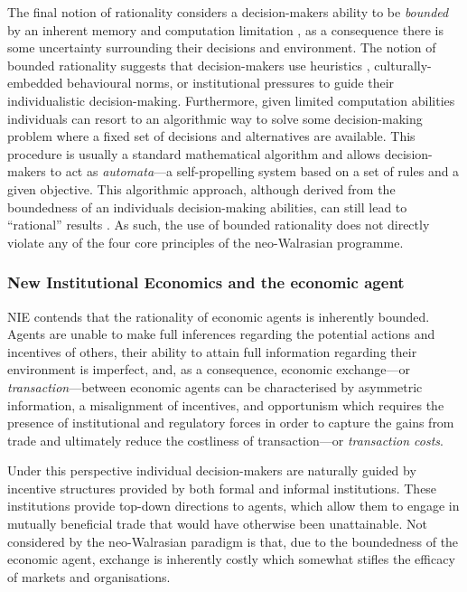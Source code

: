 The final notion of rationality considers a decision-makers ability to be \emph{bounded} by an inherent memory and computation limitation \citep{Simon1957, Simon1990, Simon1991b}, as a consequence there is some uncertainty surrounding their decisions and environment. The notion of bounded rationality suggests that decision-makers use heuristics \citep{GigerenzerGaissmaier2011}, culturally-embedded behavioural norms, or institutional pressures \citep{Hodgson1997} to guide their individualistic decision-making. Furthermore, given limited computation abilities individuals can resort to an algorithmic way to solve some decision-making problem where a fixed set of decisions and alternatives are available. This procedure is usually a standard mathematical algorithm and allows decision-makers to act as \emph{automata}---a self-propelling system based on a set of rules and a given objective. This algorithmic approach, although derived from the boundedness of an individuals decision-making abilities, can still lead to ``rational'' results \citep{Rubinstein1998}. As such, the use of bounded rationality does not directly violate any of the four core principles of the neo-Walrasian programme.

\subsubsection{New Institutional Economics and the economic agent}

NIE contends that the rationality of economic agents is inherently bounded. Agents are unable to make full inferences regarding the potential actions and incentives of others, their ability to attain full information regarding their environment is imperfect, and, as a consequence, economic exchange---or \emph{transaction}---between economic agents can be characterised by asymmetric information, a misalignment of incentives, and opportunism which requires the presence of institutional and regulatory forces in order to capture the gains from trade and ultimately reduce the costliness of transaction---or \emph{transaction costs}. 

Under this perspective individual decision-makers are naturally guided by incentive structures provided by both formal and informal institutions. These institutions provide top-down directions to agents, which allow them to engage in mutually beneficial trade that would have otherwise been unattainable. Not considered by the neo-Walrasian paradigm is that, due to the boundedness of the economic agent, exchange is inherently costly which somewhat stifles the efficacy of markets and organisations.

